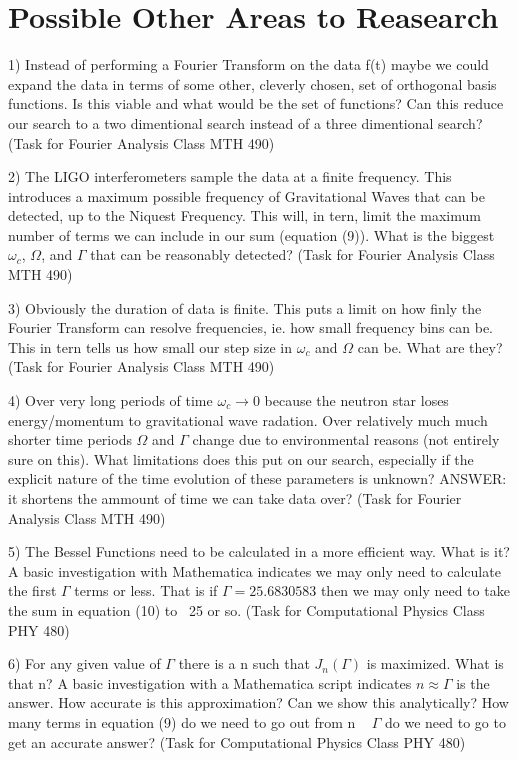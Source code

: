 \documentclass[twocolumn, groupedaddress]{revtex4-1}
\begin{document}
\section{Possible Other Areas to Reasearch}
1) Instead of performing a Fourier Transform on the data f(t) maybe we could expand the data in terms of some other, cleverly chosen, set of orthogonal basis functions.  Is this viable and what would be the set of functions?  Can this reduce our search to a two dimentional search instead of a three dimentional search? (Task for Fourier Analysis Class MTH 490)

2) The LIGO interferometers sample the data at a finite frequency.  This introduces a maximum possible frequency of Gravitational Waves that can be detected, up to the Niquest Frequency.  This will, in tern, limit the maximum number of terms we can include in our sum (equation (9)).  What is the biggest $\omega_c$, $\Omega$, and $\Gamma$ that can be reasonably detected? (Task for Fourier Analysis Class MTH 490)

3) Obviously the duration of data is finite.  This puts a limit on how finly the Fourier Transform can resolve frequencies, ie. how small frequency bins can be.  This in tern tells us how small our step size in $\omega_c$ and $\Omega$ can be.  What are they? (Task for Fourier Analysis Class MTH 490)

4) Over very long periods of time $\omega_c \to 0$ because the neutron star loses energy/momentum to gravitational wave radation.  Over relatively much much shorter time periods $\Omega$ and $\Gamma$ change due to environmental reasons (not entirely sure on this).  What limitations does this put on our search, especially if the explicit nature of the time evolution of these parameters is unknown? ANSWER: it shortens the ammount of time we can take data over? (Task for Fourier Analysis Class MTH 490)

5) The Bessel Functions need to be calculated in a more efficient way.  What is it?  A basic investigation with Mathematica indicates we may only need to calculate the first $\Gamma$ terms or less.  That is if $\Gamma = 25.6830583$ then we may only need to take the sum in equation (10) to ~25 or so. (Task for Computational Physics Class PHY 480)

6) For any given value of $\Gamma$ there is a n such that $J_n(\Gamma)$ is maximized.  What is that n?  A basic investigation with a Mathematica script indicates $n \approx \Gamma$ is the answer.  How accurate is this approximation?  Can we show this analytically?  How many terms in equation (9) do we need to go out from n ~ $\Gamma$ do we need to go to get an accurate answer? (Task for Computational Physics Class PHY 480)
\end{document}
